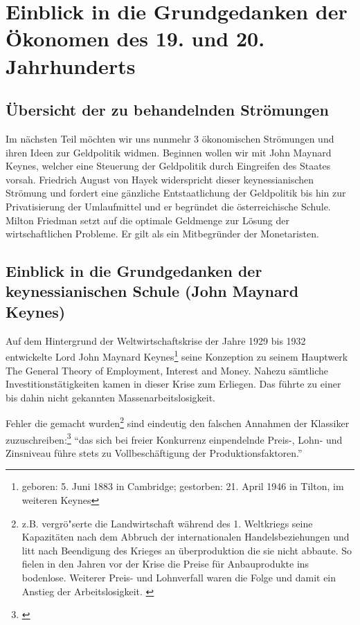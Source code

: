 \documentclass[
        onecolumn,
        a4paper,
        abstracton,
        parskip=half
        ,final
        ]{scrartcl}
\begin{document}
\clearpage







\section{Einblick in die Grundgedanken der {\"O}konomen des 19. und 20. Jahrhunderts}
  \label{sec3:stroemungen}
\subsection{{\"U}bersicht der zu behandelnden Str{\"o}mungen} %

Im n{\"a}chsten Teil m{\"o}chten wir uns nunmehr 3 {\"o}konomischen Str{\"o}mungen und ihren Ideen zur Geldpolitik widmen. Beginnen wollen wir mit John Maynard Keynes, welcher eine Steuerung der Geldpolitik durch Eingreifen des Staates vorsah. Friedrich August von Hayek widerspricht dieser keynessianischen Str{\"o}mung und fordert eine g{\"a}nzliche Entstaatlichung der Geldpolitik bis hin zur Privatisierung der Umlaufmittel und er begr{\"u}ndet die {\"o}sterreichische Schule. Milton Friedman setzt auf die optimale Geldmenge zur L{\"o}sung der wirtschaftlichen Probleme. Er gilt als ein Mitbegr{\"u}nder der Monetaristen.


\subsection{Einblick in die Grundgedanken der keynessianischen Schule (John Maynard Keynes)} %

Auf dem Hintergrund der Weltwirtschaftskrise der Jahre 1929 bis 1932 entwickelte Lord John Maynard Keynes\footnote[56]{geboren: 5. Juni 1883 in Cambridge; gestorben: 21. April 1946 in Tilton, im weiteren Keynes} seine Konzeption zu seinem Hauptwerk \frqq The General Theory of Employment, Interest and Money\flqq. Nahezu s{\"a}mtliche Investitionst{\"a}tigkeiten kamen in dieser Krise zum Erliegen. Das f{\"u}hrte zu einer bis dahin nicht gekannten Massenarbeitslosigkeit.

Fehler die gemacht wurden\footnote[57]{z.B. vergr{\"o}{"s}erte die Landwirtschaft w{\"a}hrend des 1. Weltkriegs seine Kapazit{\"a}ten nach dem Abbruch der internationalen Handelsbeziehungen und litt nach Beendigung des Krieges an {\"u}berproduktion die sie nicht abbaute. So fielen in den Jahren vor der Krise die Preise f{\"u}r Anbauprodukte ins bodenlose. Weiterer Preis- und Lohnverfall waren die Folge und damit ein Anstieg der Arbeitslosigkeit. \citep*[vgl.][S.14ff]{bombach1981theorie}} sind eindeutig den falschen Annahmen der Klassiker zuzuschreiben:\footnote[58]{\citep*[S.36]{Keynes2011}} "`das sich bei freier Konkurrenz einpendelnde Preis-, Lohn- und Zinsniveau f{\"u}hre stets zu Vollbesch{\"a}ftigung der Produktionsfaktoren."'
\end{document}

